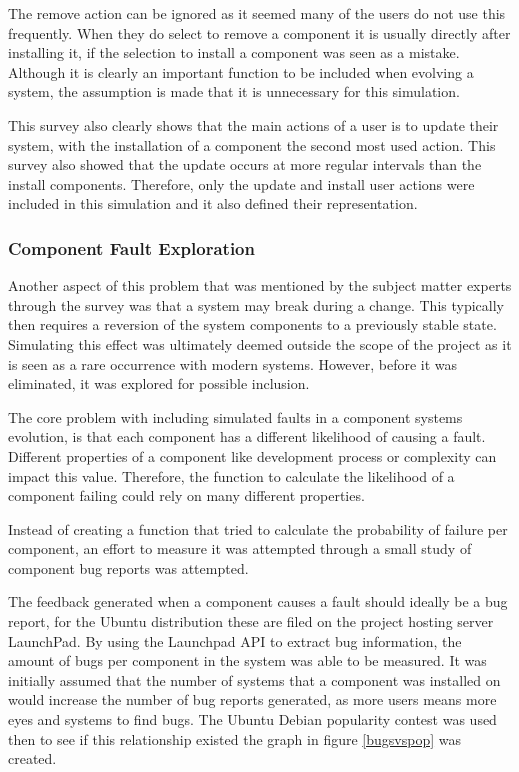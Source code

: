 The remove action can be ignored as it seemed many of the users do not use this frequently.
When they do select to remove a component it is usually directly after installing it, if the selection to install a component was seen as a mistake.
Although it is clearly an important function to be included when evolving a system, the assumption is made that it is unnecessary for this simulation.

This survey also clearly shows that the main actions of a user is to update their system,
with the installation of a component the second most used action.
This survey also showed that the update occurs at more regular intervals than the install components.
Therefore, only the update and install user actions were included in this simulation and it also defined their representation. 

\subsubsection{Component Fault Exploration}
Another aspect of this problem that was mentioned by the subject matter experts through the survey was that a system may break during a change.
This typically then requires a reversion of the system components to a previously stable state.
Simulating this effect was ultimately deemed outside the scope of the project as it is seen as a rare occurrence with modern systems.
However, before it was eliminated, it was explored for possible inclusion.

The core problem with including simulated faults in a component systems evolution, is that each component has a different likelihood of causing a fault.
Different properties of a component like development process or complexity can impact this value.
Therefore, the function to calculate the likelihood of a component failing could rely on many different properties.

Instead of creating a function that tried to calculate the probability of failure per component,
an effort to measure it was attempted through a small study of component bug reports was attempted.

The feedback generated when a component causes a fault should ideally be a bug report, for the Ubuntu distribution these are filed on the project hosting server LaunchPad.
By using the Launchpad API to extract bug information, the amount of bugs per component in the system was able to be measured.
It was initially assumed that the number of systems that a component was installed on would increase the number of bug reports generated,
as more users means more eyes and systems to find bugs.
The Ubuntu Debian popularity contest was used then to see if this relationship existed the graph in figure \ref{bugsvspop} was created.


